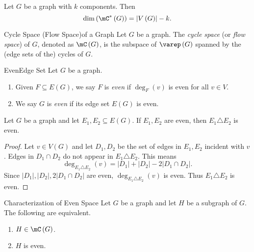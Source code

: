 \documentclass[co342]{subfiles}
\begin{document}
    \clearpage
    \begin{cor}{}
        Let $G$ be a graph with $k$ components. Then
        \begin{equation*}
            \dim\left( \mC^{*}\left( G \right) \right) = \left| V\left( G \right) \right|-k.
        \end{equation*}
    \end{cor}	
    
    \begin{definition}{Cycle Space (Flow Space)}{of a Graph}
        Let $G$ be a graph. The \emph{cycle space} (or \emph{flow space}) of $G$, denoted as $\mC\left( G \right)$, is the subspace of $\varep\left( G \right)$ spanned by the (edge sets of the) cycles of $G$.
    \end{definition}
    
    \begin{definition}{Even}{Edge Set}
        Let $G$ be a graph.
        \begin{enumerate}
            \item Given $F\subseteq E\left( G \right)$, we say $F$ is \emph{even} if $\deg_F\left( v \right)$ is even for all $v\in V$.
            \item We say $G$ is \emph{even} if its edge set $E\left( G \right)$ is even.
        \end{enumerate}
    \end{definition}

    \begin{prop}{}
        Let $G$ be a graph and let $E_1, E_2\subseteq E\left( G \right)$. If $E_1,E_2$ are even, then $E_1\triangle E_2$ is even.
    \end{prop}

    \begin{proof}
        Let $v\in V\left( G \right)$ and let $D_1,D_2$ be the set of edges in $E_1,E_2$ incident with $v$. Edges in $D_1\cap D_2$ do not appear in $E_1\triangle E_2$. This means
        \begin{equation*}
            \deg_{E_1\triangle E_2}\left( v \right) = \left| D_1 \right| + \left| D_2 \right| - 2\left| D_1\cap D_2 \right|.
        \end{equation*}
        Since $\left| D_1 \right|, \left| D_2 \right|, 2\left| D_1\cap D_2 \right|$ are even, $\deg_{E_1\triangle E_2}\left( v \right)$ is even. Thus $E_1\triangle E_2$ is even.
    \end{proof}

    \begin{prop}{Characterization of Even Space}
        Let $G$ be a graph and let $H$ be a subgraph of $G$. The following are equivalent.
        \begin{enumerate}
            \item $H\in\mC\left( G \right)$.
            \item $H$ is even.
        \end{enumerate}
    \end{prop}
\end{document}

